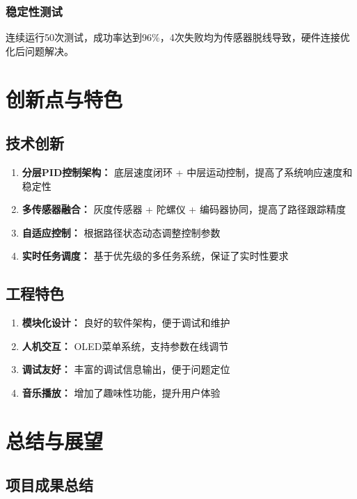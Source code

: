\documentclass[UTF8]{ctexart}
\begin{document}
\subsubsection{稳定性测试}

连续运行50次测试，成功率达到96\%，4次失败均为传感器脱线导致，硬件连接优化后问题解决。

\section{创新点与特色}

\subsection{技术创新}

\begin{enumerate}
    \item \textbf{分层PID控制架构：} 底层速度闭环 + 中层运动控制，提高了系统响应速度和稳定性
    \item \textbf{多传感器融合：} 灰度传感器 + 陀螺仪 + 编码器协同，提高了路径跟踪精度
    \item \textbf{自适应控制：} 根据路径状态动态调整控制参数
    \item \textbf{实时任务调度：} 基于优先级的多任务系统，保证了实时性要求
\end{enumerate}

\subsection{工程特色}

\begin{enumerate}
    \item \textbf{模块化设计：} 良好的软件架构，便于调试和维护
    \item \textbf{人机交互：} OLED菜单系统，支持参数在线调节
    \item \textbf{调试友好：} 丰富的调试信息输出，便于问题定位
    \item \textbf{音乐播放：} 增加了趣味性功能，提升用户体验
\end{enumerate}

\section{总结与展望}

\subsection{项目成果总结}
\end{document}
